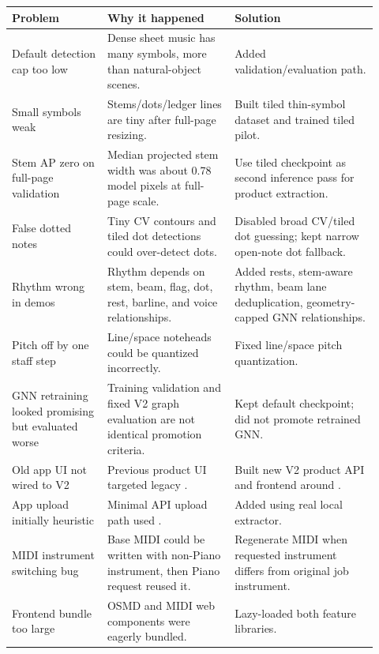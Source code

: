\documentclass[11pt]{article}
\newcommand{\code}[1]{\texttt{\detokenize{#1}}}
\begin{document}
\begin{longtable}{p{0.24\linewidth}p{0.32\linewidth}p{0.36\linewidth}}
\toprule
\textbf{Problem} & \textbf{Why it happened} & \textbf{Solution}\\
\midrule
\endhead
Default detection cap too low & Dense sheet music has many symbols, more than natural-object scenes. & Added \code{max_det=2000} validation/evaluation path.\\
Small symbols weak & Stems/dots/ledger lines are tiny after full-page resizing. & Built tiled thin-symbol dataset and trained tiled pilot.\\
Stem AP zero on full-page validation & Median projected stem width was about 0.78 model pixels at full-page scale. & Use tiled checkpoint as second inference pass for product extraction.\\
False dotted notes & Tiny CV contours and tiled dot detections could over-detect dots. & Disabled broad CV/tiled dot guessing; kept narrow open-note dot fallback.\\
Rhythm wrong in demos & Rhythm depends on stem, beam, flag, dot, rest, barline, and voice relationships. & Added rests, stem-aware rhythm, beam lane deduplication, geometry-capped GNN relationships.\\
Pitch off by one staff step & Line/space noteheads could be quantized incorrectly. & Fixed line/space pitch quantization.\\
GNN retraining looked promising but evaluated worse & Training validation and fixed V2 graph evaluation are not identical promotion criteria. & Kept default checkpoint; did not promote retrained GNN.\\
Old app UI not wired to V2 & Previous product UI targeted legacy \code{src.api}. & Built new V2 product API and frontend around \code{melodious_v2}.\\
App upload initially heuristic & Minimal API upload path used \code{heuristic_bootstrap}. & Added \code{/product/transcribe-image} using real local extractor.\\
MIDI instrument switching bug & Base MIDI could be written with non-Piano instrument, then Piano request reused it. & Regenerate MIDI when requested instrument differs from original job instrument.\\
Frontend bundle too large & OSMD and MIDI web components were eagerly bundled. & Lazy-loaded both feature libraries.\\
\bottomrule
\end{longtable}
\end{document}
